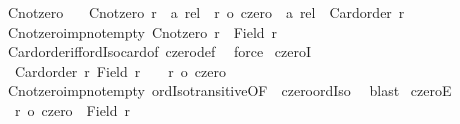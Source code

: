 \begin{isabellebody}
\endisatagproof
{\isafoldproof}%
%
\isadelimproof
\isanewline
%
\endisadelimproof
\isanewline
\isanewline
{}\isamarkupfalse%
\ Cnotzero\ \isanewline
\ \ {\isachardoublequoteopen}Cnotzero\ {\isacharparenleft}{\kern0pt}r\ {\isacharcolon}{\kern0pt}{\isacharcolon}{\kern0pt}\ {\isacharprime}{\kern0pt}a\ rel{\isacharparenright}{\kern0pt}\ {\isasymequiv}\ {\isasymnot}{\isacharparenleft}{\kern0pt}r\ {\isacharequal}{\kern0pt}o\ {\isacharparenleft}{\kern0pt}czero\ {\isacharcolon}{\kern0pt}{\isacharcolon}{\kern0pt}\ {\isacharprime}{\kern0pt}a\ rel{\isacharparenright}{\kern0pt}{\isacharparenright}{\kern0pt}\ {\isasymand}\ Card{\isacharunderscore}{\kern0pt}order\ r{\isachardoublequoteclose}\isanewline
\isanewline
\isanewline
{}\isamarkupfalse%
\ Cnotzero{\isacharunderscore}{\kern0pt}imp{\isacharunderscore}{\kern0pt}not{\isacharunderscore}{\kern0pt}empty{\isacharcolon}{\kern0pt}\ {\isachardoublequoteopen}Cnotzero\ r\ {\isasymLongrightarrow}\ Field\ r\ {\isasymnoteq}\ {\isacharbraceleft}{\kern0pt}{\isacharbraceright}{\kern0pt}{\isachardoublequoteclose}\isanewline
%
\isadelimproof
\ \ %
\endisadelimproof
%
\isatagproof
{}\isamarkupfalse%
\ Card{\isacharunderscore}{\kern0pt}order{\isacharunderscore}{\kern0pt}iff{\isacharunderscore}{\kern0pt}ordIso{\isacharunderscore}{\kern0pt}card{\isacharunderscore}{\kern0pt}of\ czero{\isacharunderscore}{\kern0pt}def\ \isamarkupfalse%
\ force%
\endisatagproof
{\isafoldproof}%
%
\isadelimproof
\isanewline
%
\endisadelimproof
\isanewline
{}\isamarkupfalse%
\ czeroI{\isacharcolon}{\kern0pt}\isanewline
\ \ {\isachardoublequoteopen}{\isasymlbrakk}Card{\isacharunderscore}{\kern0pt}order\ r{\isacharsemicolon}{\kern0pt}\ Field\ r\ {\isacharequal}{\kern0pt}\ {\isacharbraceleft}{\kern0pt}{\isacharbraceright}{\kern0pt}{\isasymrbrakk}\ {\isasymLongrightarrow}\ r\ {\isacharequal}{\kern0pt}o\ czero{\isachardoublequoteclose}\isanewline
%
\isadelimproof
%
\endisadelimproof
%
\isatagproof
{}\isamarkupfalse%
\ Cnotzero{\isacharunderscore}{\kern0pt}imp{\isacharunderscore}{\kern0pt}not{\isacharunderscore}{\kern0pt}empty\ ordIso{\isacharunderscore}{\kern0pt}transitive{\isacharbrackleft}{\kern0pt}OF\ {\isacharunderscore}{\kern0pt}\ czero{\isacharunderscore}{\kern0pt}ordIso{\isacharbrackright}{\kern0pt}\ \isamarkupfalse%
\ blast%
\endisatagproof
{\isafoldproof}%
%
\isadelimproof
\isanewline
%
\endisadelimproof
\isanewline
{}\isamarkupfalse%
\ czeroE{\isacharcolon}{\kern0pt}\isanewline
\ \ {\isachardoublequoteopen}r\ {\isacharequal}{\kern0pt}o\ czero\ {\isasymLongrightarrow}\ Field\ r\ {\isacharequal}{\kern0pt}\ {\isacharbraceleft}{\kern0pt}{\isacharbraceright}{\kern0pt}{\isachardoublequoteclose}\isanewline

\end{isabellebody}
